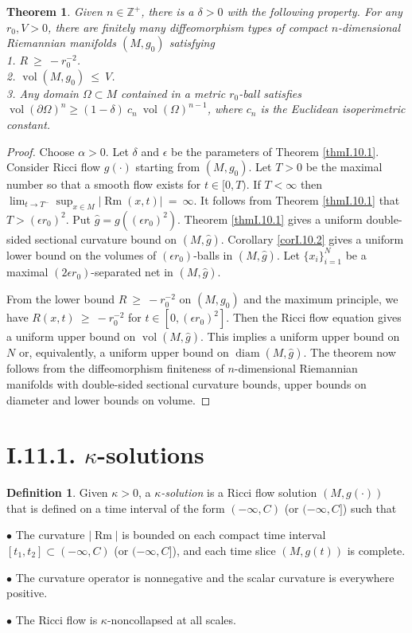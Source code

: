 \documentclass[12pt]{amsart}
\newcommand{\diam}{\operatorname{diam}}
\newcommand{\Rm}{\operatorname{Rm}}
\newcommand{\vol}{\operatorname{vol}}
\newcommand{\Z}{{\mathbb Z}}
\numberwithin{equation}{section}
\theoremstyle{plain}
\newtheorem{theorem}[equation]{Theorem}
\theoremstyle{definition}
\newtheorem{definition}[equation]{Definition}
\theoremstyle{remark}
\begin{document}
\begin{theorem}
Given $n \in \Z^+$, there is a $\delta > 0$ with the following property.  For any
$r_0, V > 0$, there are finitely many diffeomorphism types
of compact $n$-dimensional Riemannian manifolds $(M, g_0)$ satisfying \\
1. $R \: \ge \: - r_0^{-2}$. \\
2. $\vol(M, g_0) \: \le \: V$. \\
3. Any domain $\Omega \subset M$ contained in a metric
$r_0$-ball satisfies $\vol(\partial \Omega)^n
\ge (1-\delta) \: c_n \: \vol(\Omega)^{n-1}$, where $c_n$ is the
Euclidean isoperimetric constant.
\end{theorem}
\begin{proof}
Choose $\alpha > 0$. Let $\delta$ and $\epsilon$ be the parameters
of Theorem \ref{thmI.10.1}.
Consider Ricci flow $g(\cdot)$ starting from $(M, g_0)$. 
Let $T > 0$ be the maximal number so that a smooth flow exists
for $t \in [0, T)$.  If $T < \infty$ then
$\lim_{t \rightarrow T^-} \sup_{x \in M} |\Rm(x, t)| \: = \: \infty$. It
follows from Theorem \ref{thmI.10.1} that $T > (\epsilon r_0)^2$. 
Put $\widehat{g} = g((\epsilon r_0)^2)$. Theorem \ref{thmI.10.1} gives a 
uniform double-sided sectional curvature bound on $(M, \widehat{g})$. 
Corollary \ref{corI.10.2} gives a uniform lower bound on the volumes
of $(\epsilon r_0)$-balls in $(M, \widehat{g})$. Let $\{x_i\}_{i=1}^N$ be a
maximal $(2\epsilon r_0)$-separated net in $(M, \widehat{g})$. 

From the lower bound $R \: \ge \: - r_0^{-2}$ on $(M, g_0)$ and the
maximum principle, we have 
$R(x,t)  \: \ge \: - r_0^{-2}$ for $t \in [0, (\epsilon r_0)^2]$. 
Then the Ricci flow equation gives
a uniform upper bound on $\vol(M, \widehat{g})$. This implies a uniform
upper bound on $N$ or, equivalently, a uniform upper bound on 
$\diam(M, \widehat{g})$. The theorem now follows from the diffeomorphism
finiteness of $n$-dimensional Riemannian
manifolds with double-sided sectional curvature bounds,
upper bounds on diameter and lower bounds on volume.
\end{proof}




\section{I.11.1. $\kappa$-solutions}
\label{secI.11.1}

\begin{definition}
Given $\kappa > 0$, a {\em $\kappa$-solution} is a Ricci flow
solution $(M,g(\cdot))$ that is defined on a time interval of the 
form $(-\infty,C)$
(or $(-\infty,C]$)
such that 

$\bullet$ The curvature $|\Rm|$ is bounded on each compact time interval
$[t_1,t_2]\subset (-\infty,C)$
(or $(-\infty,C]$), and each time slice $(M,g(t))$ is complete.

$\bullet$ The curvature operator is nonnegative and the scalar curvature
is everywhere positive.

$\bullet$ The Ricci flow is $\kappa$-noncollapsed at all scales.
\end{definition}
\end{document}
